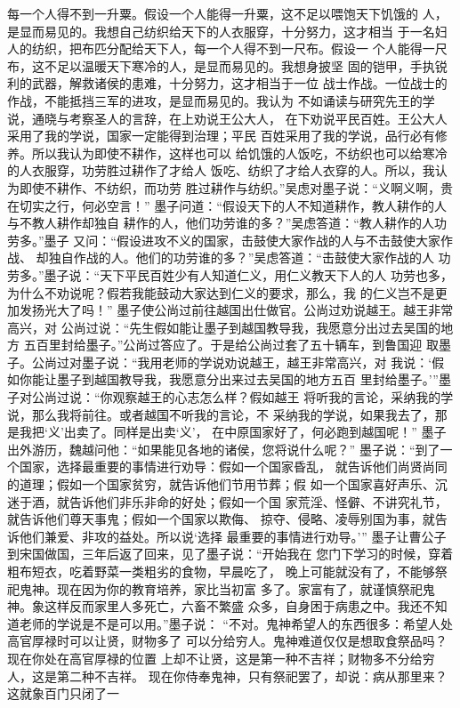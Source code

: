 \documentclass[12pt,UTF8]{ctexbook}
\begin{document}
每一个人得不到一升粟。假设一个人能得一升粟，这不足以喂饱天下饥饿的 
人，是显而易见的。我想自己纺织给天下的人衣服穿，十分努力，这才相当 
于一名妇人的纺织，把布匹分配给天下人，每一个人得不到一尺布。假设一 
个人能得一尺布，这不足以温暖天下寒冷的人，是显而易见的。我想身披坚 
固的铠甲，手执锐利的武器，解救诸侯的患难，十分努力，这才相当于一位 
战士作战。一位战士的作战，不能抵挡三军的进攻，是显而易见的。我认为 
不如诵读与研究先王的学说，通晓与考察圣人的言辞，在上劝说王公大人， 
在下劝说平民百姓。王公大人采用了我的学说，国家一定能得到治理；平民 
百姓采用了我的学说，品行必有修养。所以我认为即使不耕作，这样也可以 
给饥饿的人饭吃，不纺织也可以给寒冷的人衣服穿，功劳胜过耕作了才给人 
饭吃、纺织了才给人衣穿的人。所以，我认为即使不耕作、不纺织，而功劳 
胜过耕作与纺织。”吴虑对墨子说：“义啊义啊，贵在切实之行，何必空言！” 
墨子问道：“假设天下的人不知道耕作，教人耕作的人与不教人耕作却独自 
耕作的人，他们功劳谁的多？”吴虑答道：“教人耕作的人功劳多。”墨子 
又问：“假设进攻不义的国家，击鼓使大家作战的人与不击鼓使大家作战、 
却独自作战的人。他们的功劳谁的多？”吴虑答道：“击鼓使大家作战的人 
功劳多。”墨子说：“天下平民百姓少有人知道仁义，用仁义教天下人的人 
功劳也多，为什么不劝说呢？假若我能鼓动大家达到仁义的要求，那么，我 
的仁义岂不是更加发扬光大了吗！” 
墨子使公尚过前往越国出仕做官。公尚过劝说越王。越王非常高兴，对 
公尚过说：“先生假如能让墨子到越国教导我，我愿意分出过去吴国的地方 
五百里封给墨子。”公尚过答应了。于是给公尚过套了五十辆车，到鲁国迎 
取墨子。公尚过对墨子说：“我用老师的学说劝说越王，越王非常高兴，对 
我说：‘假如你能让墨子到越国教导我，我愿意分出来过去吴国的地方五百 
里封给墨子。’”墨子对公尚过说：“你观察越王的心志怎么样？假如越王 
将听我的言论，采纳我的学说，那么我将前往。或者越国不听我的言论，不 
采纳我的学说，如果我去了，那是我把‘义’出卖了。同样是出卖‘义’， 
在中原国家好了，何必跑到越国呢！” 
墨子出外游历，魏越问他：“如果能见各地的诸侯，您将说什么呢？” 
墨子说：“到了一个国家，选择最重要的事情进行劝导：假如一个国家昏乱， 
就告诉他们尚贤尚同的道理；假如一个国家贫穷，就告诉他们节用节葬；假 
如一个国家喜好声乐、沉迷于酒，就告诉他们非乐非命的好处；假如一个国 
家荒淫、怪僻、不讲究礼节，就告诉他们尊天事鬼；假如一个国家以欺侮、 
掠夺、侵略、凌辱别国为事，就告诉他们兼爱、非攻的益处。所以说‘选择 
最重要的事情进行劝导。’” 
墨子让曹公子到宋国做国，三年后返了回来，见了墨子说：“开始我在 
您门下学习的时候，穿着粗布短衣，吃着野菜一类粗劣的食物，早晨吃了， 
晚上可能就没有了，不能够祭祀鬼神。现在因为你的教育培养，家比当初富 
多了。家富有了，就谨慎祭祀鬼神。象这样反而家里人多死亡，六畜不繁盛 
众多，自身困于病患之中。我还不知道老师的学说是不是可以用。”墨子说： 
“不对。鬼神希望人的东西很多：希望人处高官厚禄时可以让贤，财物多了 
可以分给穷人。鬼神难道仅仅是想取食祭品吗？现在你处在高官厚禄的位置 
上却不让贤，这是第一种不吉祥；财物多不分给穷人，这是第二种不吉祥。 
现在你侍奉鬼神，只有祭祀罢了，却说：病从那里来？这就象百门只闭了一 
\end{document}
